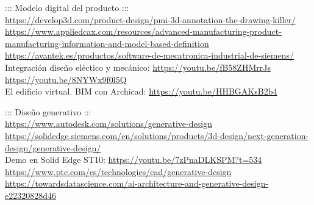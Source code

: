 \documentclass[spanish,12pt,a4paper,final,oneside]{book}
\begin{document}
::: Modelo digital del producto :::
\\ \url{https://develop3d.com/product-design/pmi-3d-annotation-the-drawing-killer/}
\\ \url{https://www.appliedcax.com/resources/advanced-manufacturing-product-manufacturing-information-and-model-based-definition}
\\ \url{https://avantek.es/productos/software-de-mecatronica-industrial-de-siemens/}
\\ Integración diseño eléctico y mecánico: \url{https://youtu.be/fB58ZHMrrJs} \url{https://youtu.be/8NYWx9f0l5Q}
\\ El edificio virtual. BIM con Archicad: \url{https://youtu.be/HHBGAKsB2b4}

::: Diseño generativo :::
\\ \url{https://www.autodesk.com/solutions/generative-design}
\\ \url{https://solidedge.siemens.com/en/solutions/products/3d-design/next-generation-design/generative-design/}
\\Demo en Solid Edge ST10: \url{https://youtu.be/7zPnaDLKSPM?t=534}
\\ \url{https://www.ptc.com/es/technologies/cad/generative-design}
\\ \url{https://towardsdatascience.com/ai-architecture-and-generative-design-e22320828d46}
\end{document}
